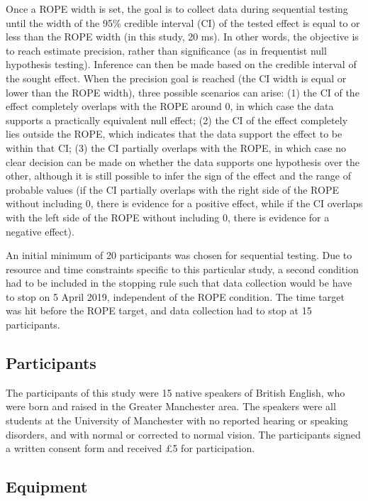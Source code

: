 \documentclass[12pt,a4paper,]{article}
\begin{document}
Once a ROPE width is set, the goal is to collect data during sequential
testing until the width of the 95\% credible interval (CI) of the tested
effect is equal to or less than the ROPE width (in this study, 20 ms).
In other words, the objective is to reach estimate precision, rather
than significance (as in frequentist null hypothesis testing). Inference
can then be made based on the credible interval of the sought effect.
When the precision goal is reached (the CI width is equal or lower than
the ROPE width), three possible scenarios can arise: (1) the CI of the
effect completely overlaps with the ROPE around 0, in which case the
data supports a practically equivalent null effect; (2) the CI of the
effect completely lies outside the ROPE, which indicates that the data
support the effect to be within that CI; (3) the CI partially overlaps
with the ROPE, in which case no clear decision can be made on whether
the data supports one hypothesis over the other, although it is still
possible to infer the sign of the effect and the range of probable
values (if the CI partially overlaps with the right side of the ROPE
without including 0, there is evidence for a positive effect, while if
the CI overlaps with the left side of the ROPE without including 0,
there is evidence for a negative effect).

An initial minimum of 20 participants was chosen for sequential testing.
Due to resource and time constraints specific to this particular study,
a second condition had to be included in the stopping rule such that
data collection would be have to stop on 5 April 2019, independent of
the ROPE condition. The time target was hit before the ROPE target, and
data collection had to stop at 15 participants.

\hypertarget{participants}{%
\subsection{Participants}\label{participants}}

The participants of this study were 15 native speakers of British
English, who were born and raised in the Greater Manchester area. The
speakers were all students at the University of Manchester with no
reported hearing or speaking disorders, and with normal or corrected to
normal vision. The participants signed a written consent form and
received £5 for participation.

\hypertarget{equipment}{%
\subsection{Equipment}\label{equipment}}
\end{document}
